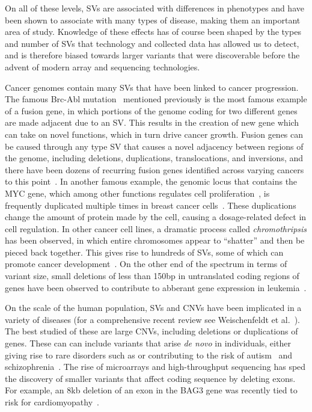 On all of these levels, SVs are associated with differences in phenotypes and have been shown to associate with many types of disease, making them an important area of study. Knowledge of these effects has of course been shaped by the types and number of SVs that technology and collected data has allowed us to detect, and is therefore biased towards larger variants that were discoverable before the advent of modern array and sequencing technologies. 

Cancer genomes contain many SVs that have been linked to cancer progression. The famous Brc-Abl mutation~\cite{Kurzrock:2003bz} mentioned previously is the most famous example of a fusion gene, in which portions of the genome coding for two different genes are made adjacent due to an SV. This results in the creation of new gene which can take on novel functions, which in turn drive cancer growth. Fusion genes can be caused through any type SV that causes a novel adjacency between regions of the genome, including deletions, duplications, translocations, and inversions, and there have been dozens of recurring fusion genes identified across varying cancers to this point~\cite{Annala:2013ks}. In another famous example, the genomic locus that contains the MYC gene, which among other functions regulates cell proliferation~\cite{Eilers:2008jk}, is frequently duplicated multiple times in breast cancer cells~\cite{Escot:1986tn}. These duplications change the amount of protein made by the cell, causing a dosage-related defect in cell regulation. In other cancer cell lines, a dramatic process called \emph{chromothripsis} has been observed, in which entire chromosomes appear to ``shatter'' and then be pieced back together. This gives rise to hundreds of SVs, some of which can promote cancer development~\cite{Stephens:2011bm}. On the other end of the spectrum in terms of variant size, small deletions of less than 150bp in untranslated coding regions of genes have been observed to contribute to abberant gene expression in leukemia~\cite{Hosokawa:1998wi}.

On the scale of the human population, SVs and CNVs have been implicated in a variety of diseases (for a comprehensive recent review see Weischenfeldt et al.~\cite{Weischenfeldt:2013fm}). The best studied of these are large CNVs, including deletions or duplications of genes. These can can include variants that arise \emph{de novo} in individuals, either giving rise to rare disorders such as  or contributing to the risk of autism~\cite{Sebat:2007bs} and schizophrenia~\cite{Walsh:2008kp}. The rise of microarrays and high-throughput sequencing has sped the discovery of smaller variants that affect coding sequence by deleting exons. For example, an 8kb deletion of an exon in the BAG3 gene was recently tied to risk for cardiomyopathy~\cite{Norton:2011ev}. 

